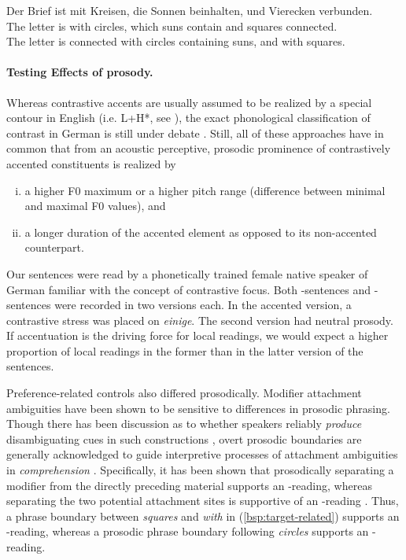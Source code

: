 \documentclass[fleqn,reqno,10pt]{article}
\newcommand{\as}{\acro{as}}
\renewcommand{\es}{\acro{es}}
\newcommand{\lc}{\acro{lc}}
\newcommand{\ec}{\acro{ec}}
\begin{document}
\begin{exe}

\ex \gll Der Brief ist mit Kreisen, die Sonnen beinhalten, und Vierecken
  verbunden. \label{bsp:target-related2}\\
The letter is with circles, which suns contain and squares connected.\\
The letter is connected with circles containing suns, and with squares.  

\end{exe}


\paragraph{Testing Effects of prosody.} Whereas contrastive accents
are usually assumed to be realized by a special contour in English
(i.e. L+H*, see \cite{Pierrehumbert90}), the exact phonological
classification of contrast in German is still under debate
\citep[see][]{Uhmann91,Fery93,Grabe98,Toepel06,Sudhoff10}.  Still,
all of these approaches have in common that from an acoustic
perceptive, prosodic prominence of contrastively accented constituents
is realized by

\begin{enumerate}[(i)]
\item a higher F0 maximum or a higher pitch range (difference 
between minimal and maximal F0 values), and
\item a longer duration of the accented element as opposed to its 
non-accented counterpart.
\end{enumerate}

\noindent Our sentences were read by a phonetically trained female
native speaker of German familiar with the concept of contrastive
focus. Both \as-sentences and \es-sentences were recorded in two
versions each. In the accented version, a contrastive stress was
placed on {\it einige}. The second version had neutral prosody.  If
accentuation is the driving force for local readings, we would expect
a higher proportion of local readings in the former than in the latter
version of the sentences.

Preference-related controls also differed prosodically. Modifier
attachment ambiguities have been shown to be sensitive to differences
in prosodic phrasing. Though there has been discussion as to whether
speakers reliably \textit{produce} disambiguating cues in such
constructions
\citep[e.g.][]{Allbritton96,Schafer00,Snedeker03,Kraljik05}, overt
prosodic boundaries are generally acknowledged to guide interpretive
processes of attachment ambiguities in \textit{comprehension}
\citep[e.g.][]{Beach1991,KjelgaardSpeer1999,Steinhauer99,SchaferSpeerWarrenWhite2000,CliftonCarlsonFrazier2002,Augurzky06}.
Specifically, it has been shown that prosodically separating a
modifier from the directly preceding material supports an \ec-reading,
whereas separating the two potential attachment sites is supportive of
an \lc-reading
\citep[e.g.][]{CliftonCarlsonFrazier2002,Fodor02,Jun2003}.  Thus, a
phrase boundary between {\it squares} and {\it with} in
(\ref{bsp:target-related}) supports an \ec-reading, whereas a prosodic
phrase boundary following {\it circles} supports an \lc-reading.
\end{document}
